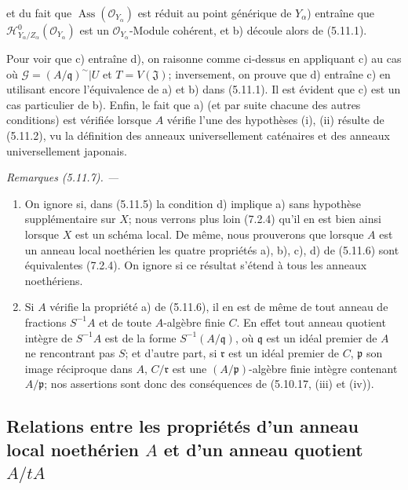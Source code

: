 \documentclass[10pt,oneside]{book}
\newcommand{\oldpage}[2][]{%
  \setcounter{footnote}{0}%
  \marginpar{\scriptsize\textbf{#1}~|~#2}\ignorespaces}
\newenvironment{remarks}[1][]{%
  \par\medskip\noindent\itshape Remarques (#1). ---\ }{\par}
\begin{document}
\oldpage[IV-2]{126}

et du fait que $\operatorname{Ass}(\mathcal O_{Y_\alpha})$ est réduit au point
générique de $Y_\alpha$) entraîne que
$\mathcal H^0_{Y_\alpha/Z_\alpha}(\mathcal O_{Y_\alpha})$ est un
$\mathcal O_{Y_\alpha}$-Module cohérent, et b) découle alors de (5.11.1).

Pour voir que c) entraîne d), on raisonne comme ci-dessus en appliquant c) au
cas où $\mathcal G=(A/\mathfrak q)^\sim\vert U$ et $T=V(\mathfrak J)$;
inversement, on prouve que d) entraîne c) en utilisant encore l'équivalence de
a) et b) dans (5.11.1). Il est évident que c) est un cas particulier de b).
Enfin, le fait que a) (et par suite chacune des autres conditions) est vérifiée
lorsque $A$ vérifie l'une des hypothèses (i), (ii) résulte de (5.11.2), vu la
définition des anneaux universellement caténaires et des anneaux
universellement japonais.

\begin{remarks}[5.11.7]
\label{IV.2.s5.11.7-fr}
\begin{enumerate}
\item[(i)] On ignore si, dans (5.11.5) la condition d) implique a) sans
hypothèse supplémentaire sur $X$; nous verrons plus loin (7.2.4) qu'il en est
bien ainsi lorsque $X$ est un schéma local. De même, nous prouverons que
lorsque $A$ est un anneau local noethérien les quatre propriétés a), b), c),
d) de (5.11.6) sont équivalentes (7.2.4). On ignore si ce résultat s'étend à
tous les anneaux noethériens.
\item[(ii)] Si $A$ vérifie la propriété a) de (5.11.6), il en est de même de
tout anneau de fractions $S^{-1}A$ et de toute $A$-algèbre finie $C$. En effet
tout anneau quotient intègre de $S^{-1}A$ est de la forme
$S^{-1}(A/\mathfrak q)$, où $\mathfrak q$ est un idéal premier de $A$ ne
rencontrant pas $S$; et d'autre part, si $\mathfrak r$ est un idéal premier de
$C$, $\mathfrak p$ son image réciproque dans $A$, $C/\mathfrak r$ est une
$(A/\mathfrak p)$-algèbre finie intègre contenant $A/\mathfrak p$; nos
assertions sont donc des conséquences de (5.10.17, (iii) et (iv)).
\end{enumerate}
\end{remarks}

\subsection{\texorpdfstring{Relations entre les propriétés d'un anneau local noethérien $A$ et
d'un anneau quotient $A/tA$}{Relations entre les propriétés d'un anneau local noethérien A et d'un anneau quotient A/tA}}
\end{document}
